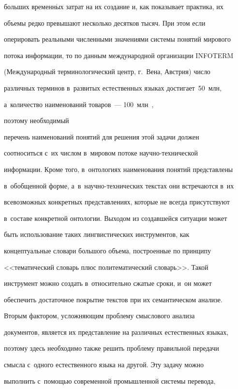 больших временн$\acute{\mbox{ы}}$х затрат на их создание и, как показывает практика, их 


объемы редко превышают несколько десятков тысяч. При этом если 


оперировать реальными численными значениями системы понятий мирового 


потока информации, то по данным международной организации INFOTERM 


(Международный терминологический центр, г.~Вена, Австрия) число 


различных терминов в~развитых естественных языках достигает~50~млн, 


а~количество наименований товаров~--- 100~млн~\cite{6-kl}, 


поэтому необходимый 


перечень наименований понятий для решения этой задачи должен 


соотноситься с~их числом в~мировом потоке на\-уч\-но-тех\-ни\-че\-ской 


информации. Кроме того, в~онтологиях наименования понятий представлены 


в~обобщенной форме, а~в~на\-уч\-но-тех\-ни\-че\-ских текстах они встречаются в~их 


всевозможных конкретных представлениях, которые не всегда присутствуют 


в~составе конкретной онтологии. Выходом из создавшейся ситуации может 


быть использование таких лингвистических инструментов, как 


концептуальные словари большого объема, построенные по принципу 


<<тематический словарь плюс политематический словарь>>. Такой 


инструмент можно создать в~относительно сжатые сроки, и~он может 


обеспечить достаточное покрытие текс\-тов при их семантическом анализе.


     


     Вторым фактором, усложняющим проблему смыслового анализа 


документов, является их представление на различных естественных языках, 


поэтому здесь необходимо также решить проблему правильной передачи 


смысла с~одного естественного языка на другой. Эту задачу можно 


выполнить с~помощью современной промышленной системы перевода, 


